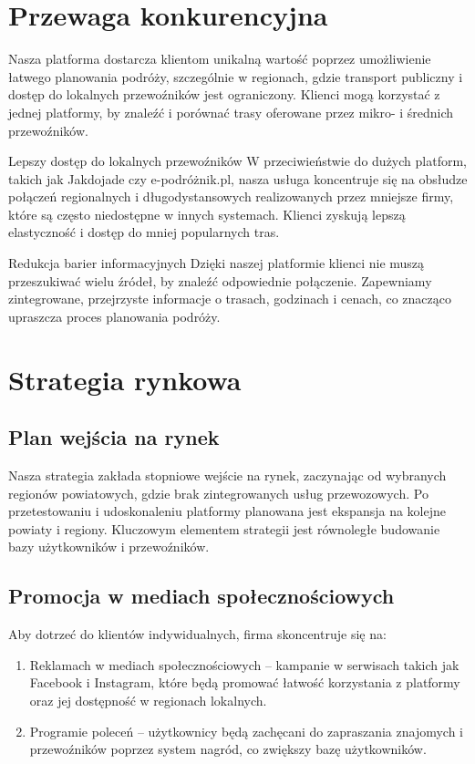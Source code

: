     \section{Przewaga konkurencyjna}

    Nasza platforma dostarcza klientom unikalną wartość poprzez umożliwienie łatwego planowania podróży, szczególnie w regionach, gdzie transport publiczny i dostęp do lokalnych przewoźników jest ograniczony. Klienci mogą korzystać z jednej platformy, by znaleźć i porównać trasy oferowane przez mikro- i średnich przewoźników.

    Lepszy dostęp do lokalnych przewoźników
    W przeciwieństwie do dużych platform, takich jak Jakdojade czy e-podróżnik.pl, nasza usługa koncentruje się na obsłudze połączeń regionalnych i długodystansowych realizowanych przez mniejsze firmy, które są często niedostępne w innych systemach. Klienci zyskują lepszą elastyczność i dostęp do mniej popularnych tras.

    Redukcja barier informacyjnych
    Dzięki naszej platformie klienci nie muszą przeszukiwać wielu źródeł, by znaleźć odpowiednie połączenie. Zapewniamy zintegrowane, przejrzyste informacje o trasach, godzinach i cenach, co znacząco upraszcza proces planowania podróży.

\section{Strategia rynkowa}

    \subsection{Plan wejścia na rynek}
    Nasza strategia zakłada stopniowe wejście na rynek, zaczynając od wybranych regionów powiatowych, gdzie brak zintegrowanych usług przewozowych. Po przetestowaniu i udoskonaleniu platformy planowana jest ekspansja na kolejne powiaty i regiony. Kluczowym elementem strategii jest równoległe budowanie bazy użytkowników i przewoźników.

    \subsection{Promocja w mediach społecznościowych}
    Aby dotrzeć do klientów indywidualnych, firma skoncentruje się na:
    \begin{enumerate}
        \item Reklamach w mediach społecznościowych – kampanie w serwisach takich jak Facebook i Instagram, które będą promować łatwość korzystania z platformy oraz jej dostępność w regionach lokalnych.
        \item Programie poleceń – użytkownicy będą zachęcani do zapraszania znajomych i przewoźników poprzez system nagród, co zwiększy bazę użytkowników.
    \end{enumerate}

